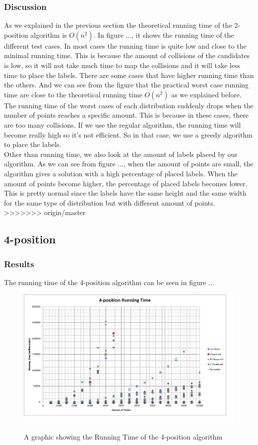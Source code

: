 \documentclass[crop=false,a4paper,oneside,11pt]{standalone}
\begin{document}
\subsubsection{Discussion}
As we explained in the previous section the theoretical running time of the 2-position algorithm is $O(n^2)$. In figure ..., it shows the running time of the different test cases. In most cases the running time is quite low and close to the minimal running time. This is because the amount of collisions of the candidates is low, so it will not take much time to map the collisions and it will take less time to place the labels. There are some cases that have higher running time than the others. And we can see from the figure that the practical worst case running time are close to the theoretical running time $O(n^2)$ as we explained before. \\
The running time of the worst cases of each distribution suddenly drops when the number of points reaches a specific amount. This is because in these cases, there are too many collisions. If we use the regular algorithm, the running time will become really high so it's not efficient. So in that case, we use a greedy algorithm to place the labels.\\
Other than running time, we also look at the amount of labels placed by our algorithm. As we can see from figure ..., when the amount of points are small, the algorithm gives a solution with a high percentage of placed labels. When the amount of points become higher, the percentage of placed labels becomes lower. This is pretty normal since the labels have the same height and the same width for the same type of distribution but with different amount of points.\\
>>>>>>> origin/master

\subsection{4-position}
\subsubsection{Results}
The running time of the 4-position algorithm can be seen in figure ...
 \begin{figure}[h!]
 \centering
 \includegraphics[scale = 0.5]{4PosRunningTime.png}\\
 \caption{A graphic showing the Running Time of the 4-position algorithm}
 \end{figure}
\end{document}
